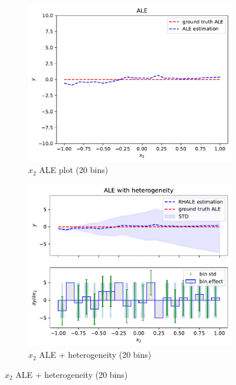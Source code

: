 \documentclass{ecai}  %
\begin{document}
\begin{figure}
    \centering
\begin{subfigure}{.33\textwidth}
  \centering
  \includegraphics[width=1\textwidth]{concept_figure_0/ale_N_100_feat_1_bins_100}
  \caption{\(x_2\) ALE plot (20 bins)}
  \label{fig:concept-figure-0-subfig-1}
\end{subfigure}%
\begin{subfigure}{.33\textwidth}
  \centering
  \includegraphics[width=1\textwidth]{concept_figure_0/ale_with_heter_N_100_bins_20_feat_1}
  \caption{\(x_2\) ALE + heterogeneity (20 bins)}
  \label{fig:concept-figure-0-subfig-2}
\end{subfigure}

\end{figure}
\end{document}
